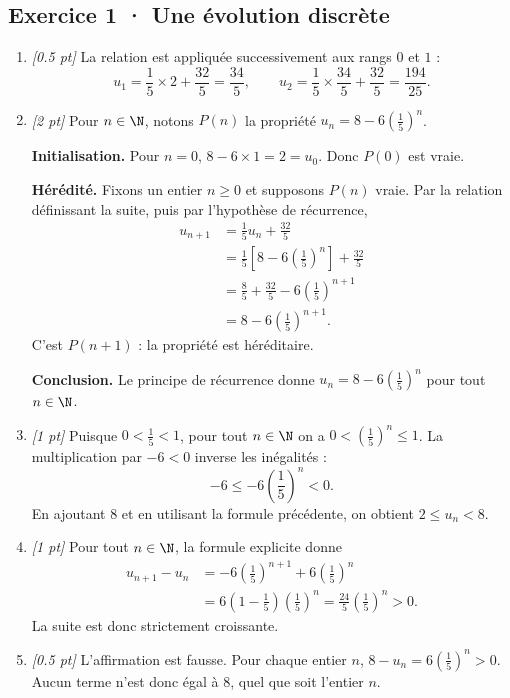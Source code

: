 \subsection*{Exercice 1 · Une évolution discrète}\begin{enumerate}

\item \textit{[\num{0,5} pt]} La relation est appliquée successivement aux rangs $0$ et $1$ :\[u_1=\frac{1}{5}\times 2+\frac{32}{5}=\frac{34}{5},\qquad u_2=\frac{1}{5}\times \frac{34}{5}+\frac{32}{5}=\frac{194}{25}.\]

\item \textit{[2 pt]} Pour $n\in\N$, notons $P(n)$ la propriété $u_n=8-6\left(\frac{1}{5}\right)^n$.
\par\smallskip\textbf{Initialisation.} Pour $n=0$, $8-6\times1=2=u_0$. Donc $P(0)$ est vraie.
\par\smallskip\textbf{Hérédité.} Fixons un entier $n\ge0$ et supposons $P(n)$ vraie. Par la relation définissant la suite, puis par l'hypothèse de récurrence,
\[\begin{aligned}u_{n+1}&=\frac{1}{5}u_n+\frac{32}{5}\\
&=\frac{1}{5}\left[8-6\left(\frac{1}{5}\right)^n\right]+\frac{32}{5}\\
&=\frac{8}{5}+\frac{32}{5}-6\left(\frac{1}{5}\right)^{n+1}\\
&=8-6\left(\frac{1}{5}\right)^{n+1}.
\end{aligned}\]
C'est $P(n+1)$ : la propriété est héréditaire.
\par\smallskip\textbf{Conclusion.} Le principe de récurrence donne $u_n=8-6\left(\frac{1}{5}\right)^n$ pour tout $n\in\N$.

\item \textit{[1 pt]} Puisque $0<\frac{1}{5}<1$, pour tout $n\in\N$ on a $0<(\frac{1}{5})^n\le1$. La multiplication par $-6<0$ inverse les inégalités :
\[-6\le-6(\frac{1}{5})^n<0.\]
En ajoutant $8$ et en utilisant la formule précédente, on obtient $2\le u_n<8$.

\item \textit{[1 pt]} Pour tout $n\in\N$, la formule explicite donne
\[\begin{aligned}u_{n+1}-u_n&=-6(\frac{1}{5})^{n+1}+6(\frac{1}{5})^n\\&=6(1-\frac{1}{5})(\frac{1}{5})^n=\frac{24}{5}(\frac{1}{5})^n>0.\end{aligned}\]
La suite est donc strictement croissante.

\item \textit{[\num{0,5} pt]} L'affirmation est fausse. Pour chaque entier $n$, $8-u_n=6(\frac{1}{5})^n>0$. Aucun terme n'est donc égal à $8$, quel que soit l'entier $n$.

\end{enumerate}

